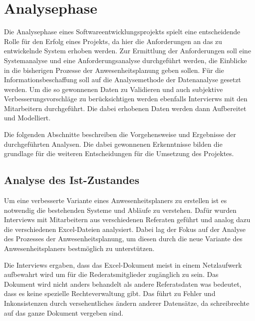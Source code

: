 \section{Analysephase}
\label{sec:Analysephase}
Die Analysephase eines Softwareentwicklungsprojekts spielt eine entscheidende Rolle für den Erfolg eines Projekts, da hier die Anforderungen an das zu entwickelnde System erhoben werden. Zur Ermittlung der Anforderungen soll eine Systemanalyse und eine Anforderungsanalyse durchgeführt werden, die Einblicke in die bisherigen Prozesse der Anwesenheitsplanung geben sollen. Für die Informationsbeschaffung soll auf die Analysemethode der Datenanalyse gesetzt werden. Um die so gewonnenen Daten zu Validieren und auch subjektive Verbesserungsvorschläge zu berücksichtigen werden ebenfalls Intervierws mit den Mitarbeitern durchgeführt. Die dabei erhobenen Daten werden dann Aufbereitet und Modelliert.

Die folgenden Abschnitte beschreiben die Vorgehensweise und Ergebnisse der durchgeführten Analysen. Die dabei gewonnenen Erkenntnisse bilden die grundlage für die weiteren Entscheidungen für die Umsetzung des Projektes.


\subsection{Analyse des Ist-Zustandes}
\label{sec:Ist-Zustand}


Um eine verbesserte Variante eines Anwesenheitsplaners zu erstellen ist es notwendig die bestehenden Systeme und Abläufe zu verstehen. Dafür wurden Interviews mit Mitarbeitern aus verschiedenen Referaten geführt und analog dazu die verschiedenen Excel-Dateien analysiert. Dabei lag der Fokus auf der Analyse des Prozesses der Anwesenheitsplanung, um diesen durch die neue Variante des Anwesenheitsplaners bestmöglich zu unterstützen.

Die Interviews ergaben, dass das Excel-Dokument meist in einem Netzlaufwerk aufbewahrt wird um für die Rederatsmitglieder zugänglich zu sein. Das Dokument wird nicht anders behandelt als andere Referatsdaten was bedeutet, dass es keine spezielle Rechteverwaltung gibt. Das führt zu Fehler und Inkonsistenzen durch versehentliches ändern anderer Datensätze, da schreibrechte auf das ganze Dokument vergeben sind.

